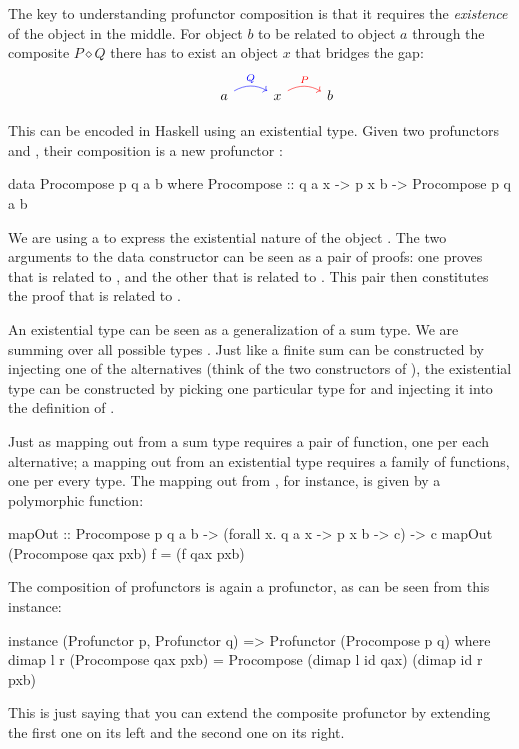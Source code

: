 \documentclass[DaoFP]{subfiles}
\begin{document}
The key to understanding profunctor composition is that it requires the \emph{existence} of the object in the middle. For object $b$ to be related to object $a$ through the composite $P \diamond Q$ there has to exist an object $x$ that bridges the gap:
\[
 \begin{tikzcd}
  & a
  \arrow[r, bend left, blue, "Q"]
 & x
  \arrow[r, bend left, red, "P"]
 & b
  \end{tikzcd}
\]

This can be encoded in Haskell using an existential type. Given two profunctors  and , their composition is a new profunctor :
\begin{haskell}
data Procompose p q a b where
  Procompose ::  q a x -> p x b -> Procompose p q a b
\end{haskell}
We are using a  to express the existential nature of the object . The two arguments to the data constructor can be seen as a pair of proofs: one proves that  is related to , and the other that  is related to . This pair then constitutes the proof that  is related to .

An existential type can be seen as a generalization of a sum type. We are summing over all possible types . Just like a finite sum can be constructed by injecting one of the alternatives (think of the two constructors of ), the existential type can be constructed by picking one particular type for  and injecting it into the definition of . 

Just as mapping out from a sum type requires a pair of function, one per each alternative; a mapping out from an existential type requires a family of functions, one per every type. The mapping out from , for instance, is given by a polymorphic function:
\begin{haskell}
mapOut :: Procompose p q a b -> (forall x. q a x -> p x b -> c) -> c
mapOut (Procompose qax pxb) f = (f qax pxb)
\end{haskell}

The composition of profunctors is again a profunctor, as can be seen from this instance:
\begin{haskell}
instance (Profunctor p, Profunctor q) => Profunctor (Procompose p q) 
  where
    dimap l r (Procompose qax pxb) = 
               Procompose (dimap l id qax) (dimap id r pxb)
\end{haskell}
This is just saying that you can extend the composite profunctor by extending the first one on its left and the second one on its right.
\end{document}
